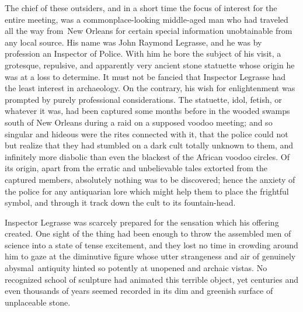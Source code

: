 The chief of these outsiders, and in a short time the focus of interest
for the entire meeting, was a commonplace-looking middle-aged man who
had traveled all the way from\est\ New Orleans for certain special
information unobtainable from any local source. His name was John
Raymond Legrasse, and he was by profession an Inspector of Police. With
him he bore the subject of his visit, a grotesque, repulsive, and
apparently very ancient stone statuette whose origin he was at a loss to
determine. It must not be fancied that Inspector Legrasse had the least
interest in archaeology. On the contrary, his wish for enlightenment was
prompted by purely professional considerations. The statuette, idol,
fetish, or whatever it was, had been captured some months before in the
wooded swamps south of New Orleans during a raid on a supposed voodoo
meeting; and so singular and hideous were the rites connected with it,
that the police could not but realize that they had stumbled on a dark
cult totally unknown to them, and infinitely more diabolic than even the
blackest of the African voodoo circles. Of its origin, apart from the
erratic and unbelievable tales extorted from the captured members,
absolutely nothing was to be discovered; hence the anxiety of the police
for any antiquarian lore which might help them to place the frightful
symbol, and through it track down the cult to its fountain-head.

Inspector Legrasse was scarcely prepared for the sensation which his
offering created. One sight of the thing had been enough to throw the
assembled men of science into a state of tense excitement, and they lost
no time in crowding around him to gaze at the diminutive figure whose
utter strangeness and air of genuinely abysmal\est\ antiquity hinted so
potently at unopened and archaic vistas. No recognized school of
sculpture had animated this terrible object, yet centuries and even
thousands of years seemed recorded in its dim and greenish surface of
unplaceable stone.

